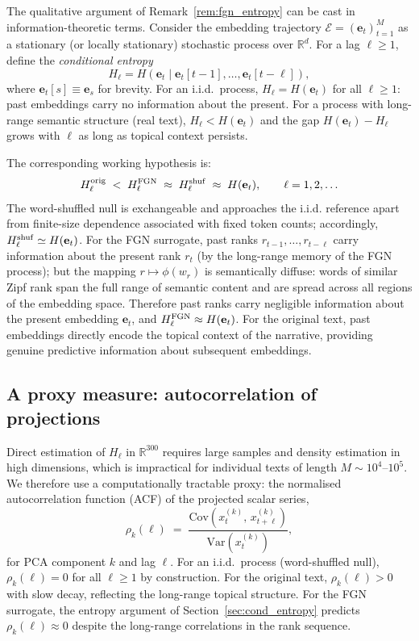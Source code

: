 \documentclass[preprint]{elsarticle}
\newcommand{\xtk}{x_t^{(k)}}
\newcommand{\et}{\mathbf{e}_t}
\newcommand{\R}{\mathbb{R}}
\begin{document}
The qualitative argument of Remark~\ref{rem:fgn_entropy} can be cast
in information-theoretic terms.
Consider the embedding trajectory $\mathcal{E} = (\et)_{t=1}^M$ as a
stationary (or locally stationary) stochastic process over $\R^d$.
For a lag $\ell \geq 1$, define the \emph{conditional entropy}
\begin{equation}
  H_\ell = H\!\left(\et \;\Big|\; \et[t-1], \ldots, \et[t-\ell]\right),
  \label{eq:cond_entropy}
\end{equation}
where $\et[s] \equiv \mathbf{e}_s$ for brevity.
For an i.i.d.\ process, $H_\ell = H(\et)$ for all $\ell \geq 1$:
past embeddings carry no information about the present.
For a process with long-range semantic structure (real text),
$H_\ell < H(\et)$ and the gap $H(\et) - H_\ell$ grows with $\ell$ as
long as topical context persists.

The corresponding working hypothesis is:
\begin{equation}
  H_\ell^{\rm orig} \;<\; H_\ell^{\rm FGN}
  \;\approx\; H_\ell^{\rm shuf} \;\approx\; H(\et),
  \qquad \ell = 1, 2, \ldots
  \label{eq:entropy_ordering}
\end{equation}
The word-shuffled null is exchangeable and approaches the i.i.d.
reference apart from finite-size dependence associated with fixed token
counts; accordingly, $H_\ell^{\rm shuf} \simeq H(\et)$.
For the FGN surrogate, past ranks $r_{t-1}, \ldots, r_{t-\ell}$
carry information about the present rank $r_t$ (by the long-range
memory of the FGN process); but the mapping $r \mapsto \phi(w_r)$ is
semantically diffuse: words of similar Zipf rank span the full range
of semantic content and are spread across all regions of the embedding
space.
Therefore past ranks carry negligible information about the present
embedding $\et$, and $H_\ell^{\rm FGN} \approx H(\et)$.
For the original text, past embeddings directly encode the topical
context of the narrative, providing genuine predictive information
about subsequent embeddings.


\subsection{A proxy measure: autocorrelation of projections}
\label{sec:autocorr_proxy}

Direct estimation of $H_\ell$ in $\R^{300}$ requires large samples and
density estimation in high dimensions, which is impractical for
individual texts of length $M \sim 10^4$--$10^5$.
We therefore use a computationally tractable proxy: the normalised
autocorrelation function (ACF) of the projected scalar series,
\begin{equation}
  \rho_k(\ell) \;=\;
  \frac{\mathrm{Cov}\!\left(\xtk,\, x_{t+\ell}^{(k)}\right)}
       {\mathrm{Var}\!\left(\xtk\right)},
  \label{eq:autocorr}
\end{equation}
for PCA component $k$ and lag $\ell$.
For an i.i.d.\ process (word-shuffled null), $\rho_k(\ell) = 0$ for
all $\ell \geq 1$ by construction.
For the original text, $\rho_k(\ell) > 0$ with slow decay, reflecting
the long-range topical structure.
For the FGN surrogate, the entropy argument of
Section~\ref{sec:cond_entropy} predicts $\rho_k(\ell) \approx 0$
despite the long-range correlations in the rank sequence.
\end{document}
